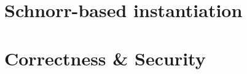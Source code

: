 \section{Schnorr-based instantiation} \label{sec:sig:schnorr-inst}


\section{Correctness \& Security}\label{sec:sig:two-party-apt-security}

